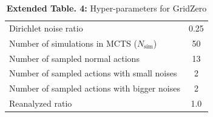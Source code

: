 \begin{table}[h]
\begin{center}
\begin{small}
{\begin{tabular}{lc}
Dirichlet noise ratio & 0.25 \\
Number of simulations in MCTS ($N_{\text{sim}}$) & 50 \\
Number of sampled normal actions & 13 \\
Number of sampled actions with small noises & 2 \\
Number of sampled actions with bigger noises & 2 \\
Reanalyzed ratio & 1.0 \\
\bottomrule
\end{tabular}
}
\end{small}
\end{center}
\captionsetup{labelformat=empty}
    \caption{\textbf{Extended Table. 4:} Hyper-parameters for GridZero}
\end{table}




